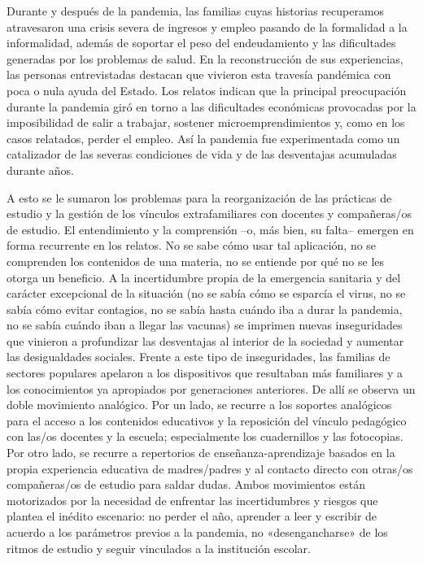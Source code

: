 \begin{refsection}
Durante y después de la pandemia, las familias cuyas historias recuperamos atravesaron una crisis severa de ingresos y empleo pasando de la formalidad a la informalidad, además de soportar el peso del endeudamiento y las dificultades generadas por los problemas de salud. En la reconstrucción de sus experiencias, las personas entrevistadas destacan que vivieron esta travesía pandémica con poca o nula ayuda del Estado. Los relatos indican que la principal preocupación durante la pandemia giró en torno a las dificultades económicas provocadas por la imposibilidad de salir a trabajar, sostener microemprendimientos y, como en los casos relatados, perder el empleo. Así la pandemia fue experimentada como un catalizador de las severas condiciones de vida y de las desventajas acumuladas durante años.

A esto se le sumaron los problemas para la reorganización de las prácticas de estudio y la gestión de los vínculos extrafamiliares con docentes y compañeras/os de estudio. El entendimiento y la comprensión –o, más bien, su falta– emergen en forma recurrente en los relatos. No se sabe cómo usar tal aplicación, no se comprenden los contenidos de una materia, no se entiende por qué no se les otorga un beneficio. A la incertidumbre propia de la emergencia sanitaria y del carácter excepcional de la situación (no se sabía cómo se esparcía el virus, no se sabía cómo evitar contagios, no se sabía hasta cuándo iba a durar la pandemia, no se sabía cuándo iban a llegar las vacunas) se imprimen nuevas inseguridades que vinieron a profundizar las desventajas al interior de la sociedad y aumentar las desigualdades sociales. Frente a este tipo de inseguridades, las familias de sectores populares apelaron a los dispositivos que resultaban más familiares y a los conocimientos ya apropiados por generaciones anteriores. De allí se observa un doble movimiento analógico. Por un lado, se recurre a los soportes analógicos para el acceso a los contenidos educativos y la reposición del vínculo pedagógico con las/os docentes y la escuela; especialmente los cuadernillos y las fotocopias. Por otro lado, se recurre a repertorios de enseñanza-aprendizaje basados en la propia experiencia educativa de madres/padres y al contacto directo con otras/os compañeras/os de estudio para saldar dudas. Ambos movimientos están motorizados por la necesidad de enfrentar las incertidumbres y riesgos que plantea el inédito escenario: no perder el año, aprender a leer y escribir de acuerdo a los parámetros previos a la pandemia, no «desengancharse» de los ritmos de estudio y seguir vinculados a la institución escolar.


\end{refsection}
